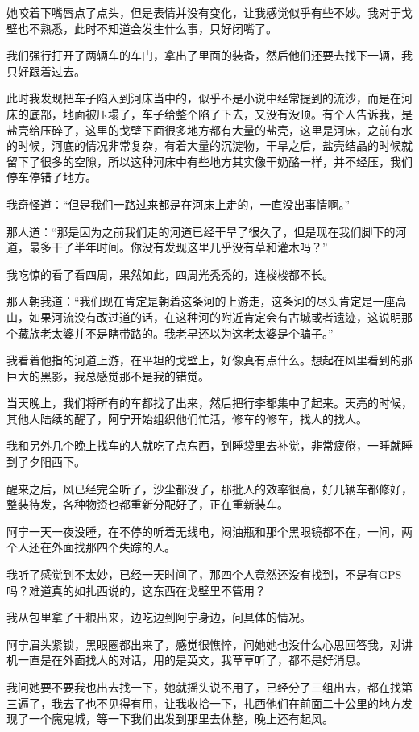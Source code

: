 她咬着下嘴唇点了点头，但是表情并没有变化，让我感觉似乎有些不妙。我对于戈壁也不熟悉，此时不知道会发生什么事，只好闭嘴了。

我们强行打开了两辆车的车门，拿出了里面的装备，然后他们还要去找下一辆，我只好跟着过去。

此时我发现把车子陷入到河床当中的，似乎不是小说中经常提到的流沙，而是在河床的底部，地面被压塌了，车子给整个陷了下去，又没有没顶。有个人告诉我，是盐壳给压碎了，这里的戈壁下面很多地方都有大量的盐壳，这里是河床，之前有水的时候，河底的情况非常复杂，有着大量的沉淀物，干旱之后，盐壳结晶的时候就留下了很多的空隙，所以这种河床中有些地方其实像干奶酪一样，并不经压，我们停车停错了地方。

我奇怪道：“但是我们一路过来都是在河床上走的，一直没出事情啊。”

那人道：“那是因为之前我们走的河道已经干旱了很久了，但是现在我们脚下的河道，最多干了半年时间。你没有发现这里几乎没有草和灌木吗？”

我吃惊的看了看四周，果然如此，四周光秃秃的，连梭梭都不长。

那人朝我道：“我们现在肯定是朝着这条河的上游走，这条河的尽头肯定是一座高山，如果河流没有改过道的话，在这种河的附近肯定会有古城或者遗迹，这说明那个藏族老太婆并不是瞎带路的。我老早还以为这老太婆是个骗子。”

我看着他指的河道上游，在平坦的戈壁上，好像真有点什么。想起在风里看到的那巨大的黑影，我总感觉那不是我的错觉。

当天晚上，我们将所有的车都找了出来，然后把行李都集中了起来。天亮的时候，其他人陆续的醒了，阿宁开始组织他们忙活，修车的修车，找人的找人。

我和另外几个晚上找车的人就吃了点东西，到睡袋里去补觉，非常疲倦，一睡就睡到了夕阳西下。

醒来之后，风已经完全听了，沙尘都没了，那批人的效率很高，好几辆车都修好，整装待发，各种物资也都重新分配好了，正在重新装车。

阿宁一天一夜没睡，在不停的听着无线电，闷油瓶和那个黑眼镜都不在，一问，两个人还在外面找那四个失踪的人。

我听了感觉到不太妙，已经一天时间了，那四个人竟然还没有找到，不是有GPS吗？难道真的如扎西说的，这东西在戈壁里不管用？

我从包里拿了干粮出来，边吃边到阿宁身边，问具体的情况。

阿宁眉头紧锁，黑眼圈都出来了，感觉很憔悴，问她她也没什么心思回答我，对讲机一直是在外面找人的对话，用的是英文，我草草听了，都不是好消息。

我问她要不要我也出去找一下，她就摇头说不用了，已经分了三组出去，都在找第三遍了，我去了也不见得有用，让我收拾一下，扎西他们在前面二十公里的地方发现了一个魔鬼城，等一下我们出发到那里去休整，晚上还有起风。

